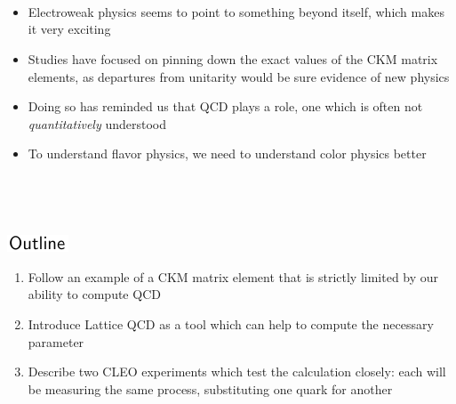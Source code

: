 \documentclass[landscape]{article}
\newenvironment{slide}[1][ ]{\mbox{\bf \boldmath #1 } \vfill}{\vfill \vspace{-1.5 cm} \mbox{ } \pagebreak}
\newenvironment{itemizer}[1]{\begin{itemize}\setlength{\itemsep}{#1}}{\end{itemize}}
\begin{document}
\begin{slide}
\begin{itemizer}{0.5 cm}
\begin{itemizer}{0.5 cm}
    \end{itemizer}

\end{itemizer}

\end{slide}

\begin{slide}

\begin{itemizer}{1 cm}

  \item Electroweak physics seems to point to something beyond itself,
  which makes it very exciting

  \item Studies have focused on pinning down the exact values of the
  CKM matrix elements, as departures from unitarity would be sure
  evidence of new physics

  \item Doing so has reminded us that QCD plays a role, one which is
  often not {\it quantitatively} understood

  \item To understand flavor physics, we need to understand color
  physics better

\end{itemizer}

\vspace{1 cm}

\end{slide}

\begin{slide}

\begin{center}
  \includegraphics[width=5 cm]{title_outline}
\end{center}

\vspace{1 cm}

\begin{enumerate}\setlength{\itemsep}{2 cm}

  \item Follow an example of a CKM matrix element that is strictly
  limited by our ability to compute QCD

  \item Introduce Lattice QCD as a tool which can help to compute the
  necessary parameter
  
  \item Describe two CLEO experiments which test the calculation
  closely: each will be measuring the same process, substituting one
  quark for another

\end{enumerate}

\end{slide}
\end{document}
